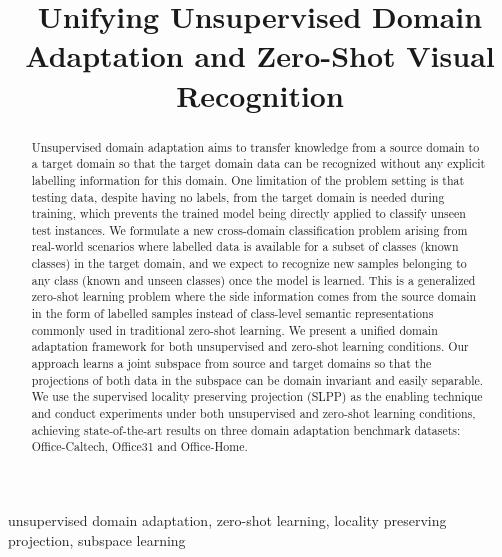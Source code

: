 \documentclass[conference]{IEEEtran}
\begin{document}
\title{Unifying Unsupervised Domain Adaptation and Zero-Shot Visual Recognition
}

\author{
}

\maketitle

\begin{abstract}
Unsupervised domain adaptation aims to transfer knowledge from a source domain to a target domain so that the target domain data can be recognized without any explicit labelling information for this domain. One limitation of the problem setting is that testing data, despite having no labels, from the target domain is needed during training, which prevents the trained model being directly applied to classify unseen test instances. We formulate a new cross-domain classification problem arising from real-world scenarios where labelled data is available for a subset of classes (known classes) in the target domain, and we expect to recognize new samples belonging to any class (known and unseen classes) once the model is learned. This is a generalized zero-shot learning problem where the side information comes from the source domain in the form of labelled samples instead of class-level semantic representations commonly used in traditional zero-shot learning. We present a unified domain adaptation framework for both unsupervised and zero-shot learning conditions. Our approach learns a joint subspace from source and target domains so that the projections of both data in the subspace can be domain invariant and easily separable. We use the supervised locality preserving projection (SLPP) as the enabling technique and conduct experiments under both unsupervised and zero-shot learning conditions, achieving state-of-the-art results on three domain adaptation benchmark datasets: Office-Caltech, Office31 and Office-Home.
\end{abstract}

\begin{IEEEkeywords}
unsupervised domain adaptation, zero-shot learning, locality preserving projection, subspace learning
\end{IEEEkeywords}
\end{document}
